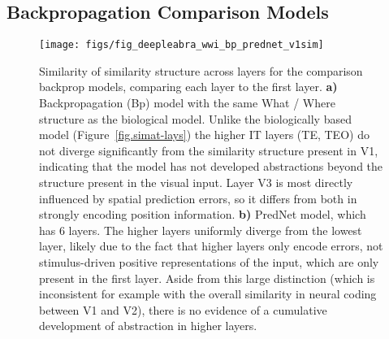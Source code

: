 \documentclass[11pt,twoside]{article}
\newif\myifpdf
\begin{document}
\subsection{Backpropagation Comparison Models}

\begin{figure}
  \centering\texttt{[image: figs/fig\_deepleabra\_wwi\_bp\_prednet\_v1sim]}
  \caption{\footnotesize Similarity of similarity structure across layers for the comparison backprop models, comparing each layer to the first layer.  {\bf a)} Backpropagation (Bp) model with the same What / Where structure as the biological model.  Unlike the biologically based model (Figure~\ref{fig.simat-lays}) the higher IT layers (TE, TEO) do not diverge significantly from the similarity structure present in V1, indicating that the model has not developed abstractions beyond the structure present in the visual input.  Layer V3 is most directly influenced by spatial prediction errors, so it differs from both in strongly encoding position information.  {\bf b)} PredNet model, which has 6 layers.  The higher layers uniformly diverge from the lowest layer, likely due to the fact that higher layers only encode errors, not stimulus-driven positive representations of the input, which are only present in the first layer.  Aside from this large distinction (which is inconsistent for example with the overall similarity in neural coding between V1 and V2), there is no evidence of a cumulative development of abstraction in higher layers.}
  \label{fig.bpred-v1sim}
\end{figure}

\end{document}
